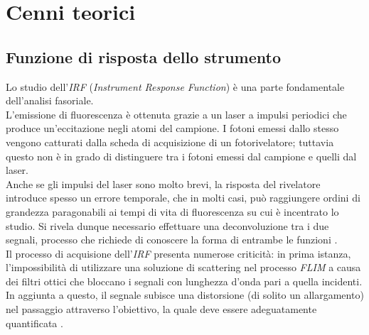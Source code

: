 \section{Cenni teorici}\label{sec:cenni_teorici} 



\subsection{Funzione di risposta dello strumento} 

Lo studio dell'\textit{IRF} (\textit{Instrument Response Function}) è una parte fondamentale dell'analisi fasoriale. \\
L'emissione di fluorescenza è ottenuta grazie a un laser a impulsi periodici che produce un'eccitazione negli atomi del campione. I fotoni emessi dallo stesso vengono catturati dalla scheda di acquisizione di un fotorivelatore; tuttavia questo non è in grado di distinguere tra i fotoni emessi dal campione e quelli dal laser.\\


\noindent Anche se gli impulsi del laser sono molto brevi, la risposta del rivelatore introduce spesso un errore temporale, che in molti casi, può raggiungere ordini di grandezza paragonabili ai tempi di vita di fluorescenza su cui è incentrato lo studio. Si rivela dunque necessario effettuare una deconvoluzione tra i due segnali, processo che richiede di conoscere la forma di entrambe le funzioni \cite{ranjitFitfreeAnalysisFluorescence2018}.\\

\noindent Il processo di acquisione dell'\textit{IRF} presenta numerose criticità: in prima istanza, l'impossibilità di utilizzare una soluzione di scattering nel processo \textit{FLIM} a causa dei filtri ottici che bloccano i segnali con lunghezza d'onda pari a quella incidenti.\\
In aggiunta a questo, il segnale subisce una distorsione (di solito un allargamento) nel passaggio attraverso l'obiettivo, la quale deve essere adeguatamente quantificata \cite{ranjitFitfreeAnalysisFluorescence2018}. \\

